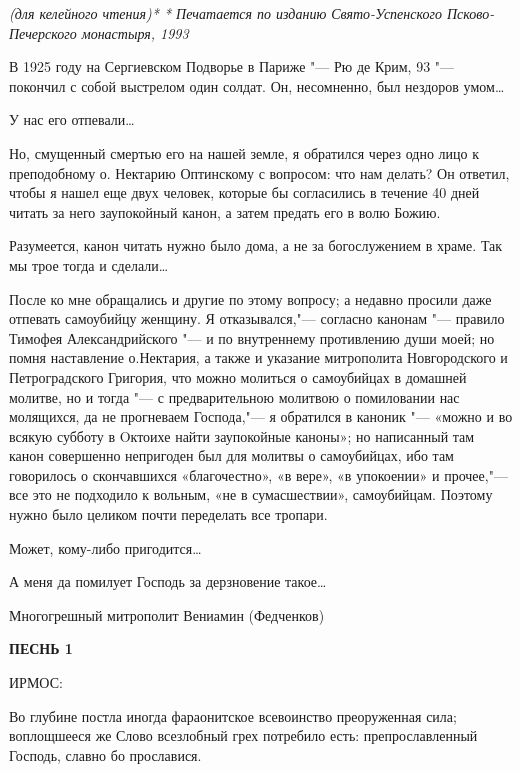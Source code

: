  


\itshape (для келейного чтения)* * Печатается по изданию Свято-Успенского Псково-Печерского монастыря, 1993


В 1925 году на Сергиевском Подворье в Париже "--- Рю де Крим, 93 "--- покончил с собой выстрелом один солдат. Он, несомненно, был нездоров умом…


У нас его отпевали…


Но, смущенный смертью его на нашей земле, я обратился через одно лицо к преподобному о. Нектарию Оптинскому с вопросом: что нам делать? Он ответил, чтобы я нашел еще двух человек, которые бы согласились в течение 40 дней читать за него заупокойный канон, а затем предать его в волю Божию.


Разумеется, канон читать нужно было дома, а не за богослужением в храме. Так мы трое тогда и сделали…


После ко мне обращались и другие по этому вопросу; а недавно просили даже отпевать самоубийцу женщину. Я отказывался,"--- согласно канонам "--- правило Тимофея Александрийского "--- и по внутреннему противлению души моей; но помня наставление о.Нектария, а также и указание митрополита Новгородского и Петроградского Григория, что можно молиться о самоубийцах в домашней молитве, но и тогда "--- с предварительною молитвою о помиловании нас молящихся, да не прогневаем Господа,"--- я обратился в каноник "--- «можно и во всякую субботу в Oктоихе найти заупокойные каноны»; но написанный там канон совершенно непригоден был для молитвы о самоубийцах, ибо там говорилось о скончавшихся «благочестно», «в вере», «в упокоении» и прочее,"--- все это не подходило к вольным, «не в сумасшествии», самоубийцам. Поэтому нужно было целиком почти переделать все тропари.


Может, кому-либо пригодится…


А меня да помилует Господь за дерзновение такое…


Многогрешный митрополит Вениамин (Федченков)\normalfont{} 




\bfseries ПЕСНЬ 1


ИРМОС:\normalfont{}


Во глубине постла иногда фараонитское всевоинство преоруженная сила; воплощшееся же Слово всезлобный грех потребило есть: препрославленный Господь, славно бо прославися.


